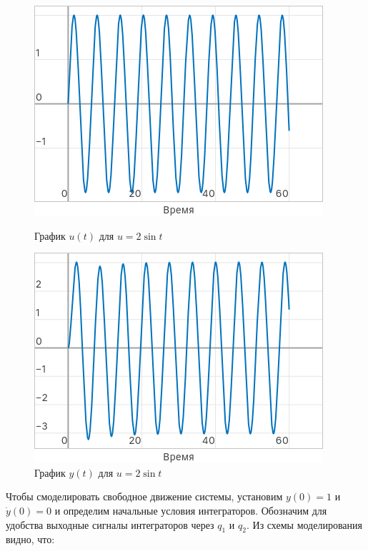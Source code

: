 \documentclass[a4paper]{article}
\begin{document}
\begin{figure}[H]
    \centering
    \begin{minipage}{0.4\textwidth}
        \includegraphics[width=\textwidth]{sources/task1_2sint_u.png}
        \caption*{График $u(t)$ для $u=2\sin{t}$}
    \end{minipage}
    \hspace{2em}
    \begin{minipage}{0.4\textwidth}
        \includegraphics[width=\textwidth]{sources/task1_2sint_y.png}
        \caption*{График $y(t)$ для $u=2\sin{t}$}
    \end{minipage}
\end{figure}
Чтобы смоделировать свободное движение системы, установим $y(0)=1$ и $\dot{y}(0)=0$ и определим начальные условия интеграторов. Обозначим для удобства выходные сигналы интеграторов через $q_1$ и $q_2$. Из схемы моделирования видно, что:
\end{document}
